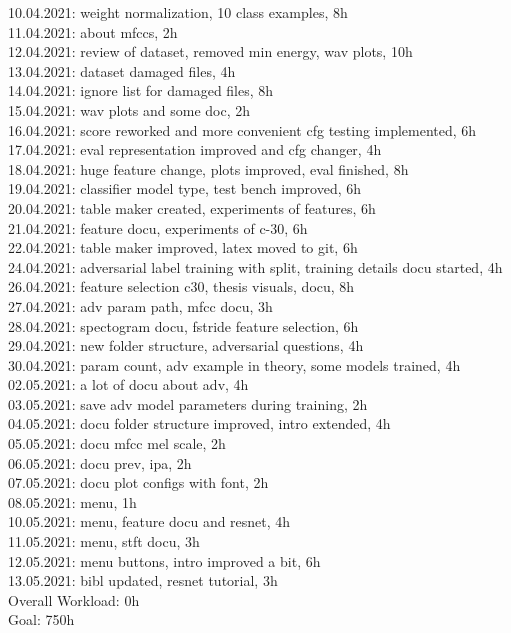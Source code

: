 10.04.2021: weight normalization, 10 class examples, 8h\\
11.04.2021: about mfccs, 2h\\

12.04.2021: review of dataset, removed min energy, wav plots, 10h\\

13.04.2021: dataset damaged files, 4h\\
14.04.2021: ignore list for damaged files, 8h\\

15.04.2021: wav plots and some doc, 2h\\
16.04.2021: score reworked and more convenient cfg testing implemented, 6h\\


17.04.2021: eval representation improved and cfg changer, 4h\\
18.04.2021: huge feature change, plots improved, eval finished, 8h\\

19.04.2021: classifier model type, test bench improved, 6h\\
20.04.2021: table maker created, experiments of features, 6h\\

21.04.2021: feature docu, experiments of c-30, 6h\\

22.04.2021: table maker improved, latex moved to git, 6h\\
24.04.2021: adversarial label training with split, training details docu started, 4h\\

26.04.2021: feature selection c30, thesis visuals, docu, 8h\\
27.04.2021: adv param path, mfcc docu, 3h\\

28.04.2021: spectogram docu, fstride feature selection, 6h\\
29.04.2021: new folder structure, adversarial questions, 4h\\

30.04.2021: param count, adv example in theory, some models trained, 4h\\
02.05.2021: a lot of docu about adv, 4h\\
03.05.2021: save adv model parameters during training, 2h\\

04.05.2021: docu folder structure improved, intro extended, 4h\\
05.05.2021: docu mfcc mel scale, 2h\\
06.05.2021: docu prev, ipa, 2h\\
07.05.2021: docu plot configs with font, 2h\\

08.05.2021: menu, 1h\\
10.05.2021: menu, feature docu and resnet, 4h\\
11.05.2021: menu, stft docu, 3h\\
12.05.2021: menu buttons, intro improved a bit, 6h\\

13.05.2021: bibl updated, resnet tutorial, 3h\\


\vspace{0.5cm}
\noindent
Overall Workload: 0h\\
Goal: 750h